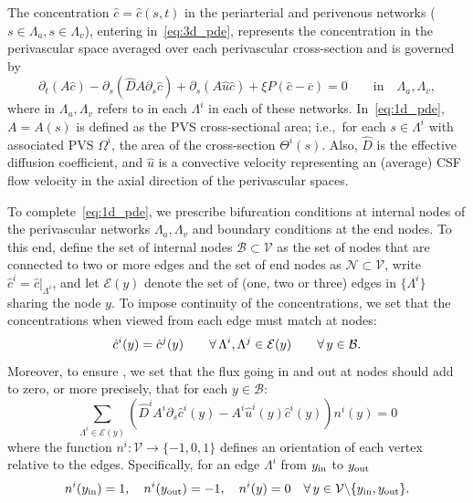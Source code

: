 The concentration $\hat{c} = \hat{c}(s, t)$ in the periarterial and
perivenous networks ($s \in \Lambda_a, s \in \Lambda_v$), entering
in~\eqref{eq:3d_pde}, represents the concentration in the perivascular
space averaged over each perivascular cross-section and is governed by 
\begin{equation}
  \partial_t (A  \hat c) - \partial_s( \hat D A \partial_s \hat c  ) + \partial_s(A \hat u \hat c )  +  \xi P (\hat c - \overline{c}) = 0
  \qquad \text{in} \quad \Lambda_a, \Lambda_v ,
\label{eq:1d_pde}
\end{equation}
where in $\Lambda_a, \Lambda_v$ refers to in each $\Lambda^i$ in each
of these networks. In~\eqref{eq:1d_pde}, $A = A(s)$ is defined as the
PVS cross-sectional area; i.e.,~for each $s \in \Lambda^i$ with
associated PVS $\Omega^i$, the area of the cross-section
$\Theta^i(s)$. Also, $\hat{D}$ is the effective diffusion coefficient,
and $\hat{u}$ is a convective velocity representing an (average) CSF
flow velocity in the axial direction of the perivascular spaces.

To complete~\eqref{eq:1d_pde}, we prescribe bifurcation conditions at
internal nodes of the perivascular networks $\Lambda_a, \Lambda_v$ and
boundary conditions at the end nodes. To this end, define the set of
internal nodes $\mathcal{B} \subset \mathcal{V}$ as the set of nodes
that are connected to two or more edges and the set of end nodes as
$\mathcal{N} \subset \mathcal{V}$, write $\hat{c}^i =
\hat{c}|_{\Lambda^i}$, and let $\mathcal{E}(y)$ denote the set of
(one, two or three) edges in $\{\Lambda^i\}$ sharing the node $y$. To
impose continuity of the concentrations, we set that the
concentrations when viewed from each edge must match at nodes:
\begin{equation}
  \hat{c}^i (y) = \hat{c}^j(y)
  \qquad \forall \, \Lambda^i, \Lambda^j \in \mathcal{E}(y)
  \qquad \forall \, y \in \mathcal{B} .
  \label{eq:conc_continuity}
\end{equation}
Moreover, to ensure , we set that the flux
going in and out at nodes should add to zero, or more precisely, that
for each $y \in \mathcal{B}$:
\begin{equation}
  \sum_{\Lambda^i \in \mathcal{E}(y)}
  \left (\hat{D}^i A^i \partial_s \hat{c}^i (y) - A^i \hat u^i(y) \hat{c}^i(y) \right ) n^i(y)
  = 0
  \label{eq:flux_conservation}
\end{equation}
where the function $n^i : \mathcal{V} \rightarrow \{-1, 0, 1\}$
defines an orientation of each vertex relative to the
edges. Specifically, for an edge $\Lambda^i$ from $y_{\rm in}$ to $y_{\rm out}$
\begin{equation}
  n^i(y_{\rm in}) = 1, \quad
  n^i(y_{\rm{out}}) = -1, \quad
  n^i(y) = 0 \quad \forall \, y \in 
  \mathcal{V} \backslash \{ y_{\rm in}, y_{\rm out} \} .  
  \label{eq:def:sign}
\end{equation}

